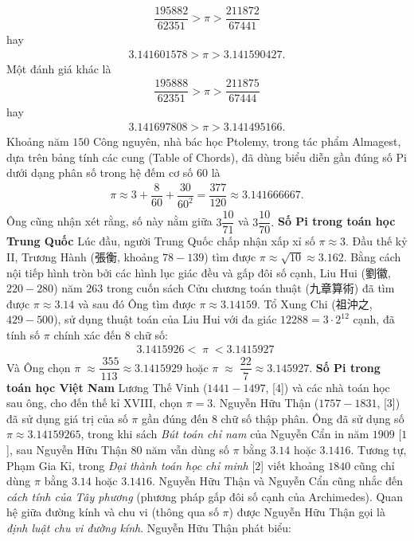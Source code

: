 \begin{multicols}{2}
	\begin{align*}
		\dfrac{{195882}}{{62351}} > \pi  > \dfrac{{211872}}{{67441}}
	\end{align*}
	hay 
	\begin{align*}
		3.141601578 > \pi  > 3.141590427.
	\end{align*}
	Một đánh giá khác là 
	\begin{align*}
		\dfrac{{195888}}{{62351}} > \pi  > \dfrac{{211875}}{{67444}}
	\end{align*}
	hay 
	\begin{align*}
		3.141697808 > \pi  > 3.141495166.
	\end{align*}
	Khoảng năm $150$ Công nguyên, nhà bác học Ptolemy, trong tác phẩm Almagest, dựa trên bảng tính các cung (Table of Chords), đã dùng biểu diễn gần đúng số Pi dưới dạng phân số trong hệ đếm cơ số $60$ là 
	\begin{align*}
		\pi  \approx 3 + \dfrac{8}{{60}} + \dfrac{{30}}{{{{60}^2}}} = \dfrac{{377}}{{120}} \approx 3.141666667.
	\end{align*}
	Ông cũng nhận xét rằng, số này nằm giữa $3\dfrac{{10}}{{71}}$  và  $3\dfrac{{10}}{{70}}.$
	\vskip 0.1cm
	\textbf{\color{lichsutoanhoc}Số Pi trong toán học Trung Quốc}
	\vskip 0.1cm
	Lúc đầu, người Trung Quốc chấp nhận xấp xỉ số $\pi \approx 3$. Đầu thế kỷ II, Trương Hành (張衡, khoảng $78-139$) tìm được  $\pi  \approx \sqrt {10}  \approx 3.162$. Bằng cách nội tiếp hình tròn bởi các hình lục giác đều và gấp đôi số cạnh, Liu Hui (劉徽, $220-280$) năm $263$ trong cuốn sách Cửu chương toán thuật (九章算術) đã tìm được $\pi  \approx 3.14$  và sau đó Ông tìm được  $\pi  \approx 3.14159.$ Tổ Xung Chi (祖沖之, $429-500$), sử dụng thuật toán của Liu Hui với đa giác $12288 = 3 \cdot {2^{12}}$  cạnh, đã tính số $\pi$  chính xác đến $8$ chữ số:
	\begin{align*}
		3.1415926 < \;\pi \; < 3.1415927\;
	\end{align*}
	Và Ông chọn $\pi \; \approx \dfrac{{\;355}}{{113}} \approx 3.1415929$
	hoặc  $\pi \; \approx \;\dfrac{{22}}{7} \approx 3.145927$. 
	\vskip 0.1cm
	\textbf{\color{lichsutoanhoc}Số Pi trong toán học Việt Nam}
	\vskip 0.1cm
	Lương Thế Vinh ($1441-1497$, [$4$]) và các nhà toán học sau ông, cho đến thế kỉ XVIII, chọn $\pi = 3$.  Nguyễn Hữu Thận ($1757-1831$, [$3$]) đã sử dụng giá trị của số $\pi$ gần đúng đến $8$ chữ số thập phân. Ông đã sử dụng số $\pi  \approx 3.14159265$,  trong khi sách \textit{Bút toán chỉ nam} của Nguyễn Cẩn in năm $1909$ [$1$], sau Nguyễn Hữu Thận $80$ năm vẫn dùng số  $\pi$  bằng $3.14$ hoặc $3.1416$. Tương tự, Phạm Gia Kỉ, trong \textit{Đại thành toán học chỉ minh} [$2$] viết khoảng $1840$ cũng chỉ dùng $\pi$  bằng $3.14$ hoặc $3.1416$.  Nguyễn Hữu Thận và Nguyễn Cẩn cũng nhắc đến \textit{cách tính của Tây phương} (phương pháp gấp đôi số cạnh của Archimedes). Quan hệ giữa đường kính và chu vi (thông qua số  $\pi$) được Nguyễn Hữu Thận gọi là \textit{định luật chu vi đường kính}. Nguyễn Hữu Thận phát biểu:

\end{multicols}
